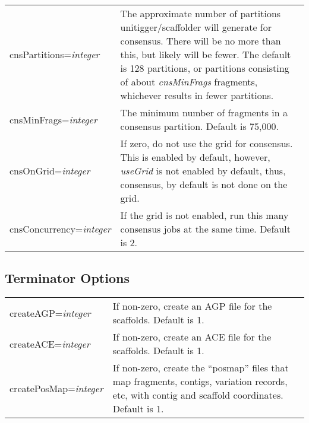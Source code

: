 \documentclass[twoside,11pt]{article}
\begin{document}
\begin{longtable}{lp{3.0in}}
cnsPartitions={\it integer} &
The approximate number of partitions unitigger/scaffolder will
generate for consensus.  There will be no more than this, but likely
will be fewer.  The default is 128 partitions, or partitions
consisting of about {\it cnsMinFrags} fragments, whichever results in fewer
partitions.
\\

cnsMinFrags={\it integer} &
The minimum number of fragments in a consensus partition.  Default
is 75,000.
\\

cnsOnGrid={\it integer} &
If zero, do not use the grid for consensus.  This is enabled by
default, however, {\em useGrid} is not enabled by default, thus,
consensus, by default is not done on the grid.
\\

cnsConcurrency={\it integer} &
If the grid is not enabled, run this many consensus jobs at the same
time.  Default is 2.
\\
\end{longtable}


\subsection{Terminator Options}
\begin{longtable}{lp{3.0in}}
createAGP={\it integer} &
If non-zero, create an AGP file for the scaffolds.  Default is 1.
\\

createACE={\it integer} &
If non-zero, create an ACE file for the scaffolds.  Default is 1.
\\

createPosMap={\it integer} &
If non-zero, create the ``posmap'' files that map fragments, contigs,
variation records, etc, with contig and scaffold coordinates.  Default
is 1.
\\
\end{longtable}
\end{document}

